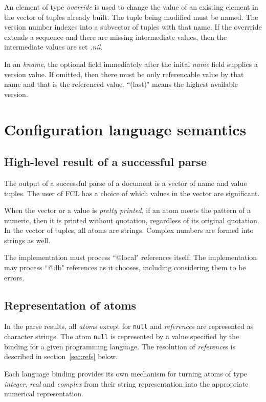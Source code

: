 \documentclass[twoside]{memarticle}
\begin{document}
An element of type \emph{override} is used to
change the value of an existing element in the vector of tuples
already built.
The tuple being modified must be named.
The version number indexes into a subvector of tuples with that name.
If the overrride extends a sequence and there are missing intermediate values,
then the intermediate values are set {\em .nil}.

In an {\em hname},
the optional field immediately after the inital {\em name} field supplies
a version value.
If omitted, then there must be only referencable value by that name and
that is the referenced value.
``(last)" means the highest available version.

\chapter{Configuration language semantics}
\section{High-level result of a successful parse}

The output of a successful parse of a document is a
vector of name and value tuples.
The user of FCL has a choice of which values in the vector are significant.

When the vector or a value is {\em pretty printed},
if an atom meets the pattern of a numeric,
then it is printed without quotation, regardless of its original quotation.
In the vector of tuples, all atoms are strings.
Complex numbers are formed into strings as well.

The implementation must process ``@local" references itself.
The implementation may process ``@db" references as it chooses,
including considering them to be errors.

\section{Representation of atoms}
In the parse results,
all \emph{atom}s
except for \texttt{null} and \emph{reference}s
are represented as character strings.
The atom \texttt{null} is represented by a 
value specified by the binding for a given programming language.
The resolution of \emph{reference}s is described in
section~\ref{sec:refs} below.

Each language binding
provides its own mechanism
for turning atoms of type \emph{integer}, \emph{real} and \emph{complex}
from their string representation
into the appropriate numerical representation.
\end{document}
